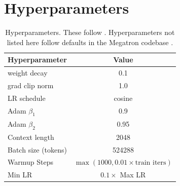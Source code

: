 

\section{Hyperparameters}
\label{appendix:hps}


\begin{table}[h]
    \begin{center}
        \begin{tabular}{l c }
        \toprule
        Hyperparameter & Value \\
        \midrule
        weight decay & 0.1 \\
        grad clip norm & 1.0 \\
        LR schedule & cosine \\
        Adam $\beta_1$ & 0.9 \\
        Adam $\beta_2$ & 0.95 \\
        Context length & 2048 \\
        Batch size (tokens) & 524288 \\
        Warmup Steps & $\max(1000, 0.01 \times \textrm{train iters})$ \\
        Min LR & $0.1 \times$ Max LR \\
        \bottomrule
        \end{tabular}
    \end{center}
    \caption{Hyperparameters. These follow \cite{brown2020language}. Hyperparameters not listed here follow defaults in the Megatron codebase \cite{shoeybi2019megatron}.}
    \label{table:hps_appendix}
\end{table}

